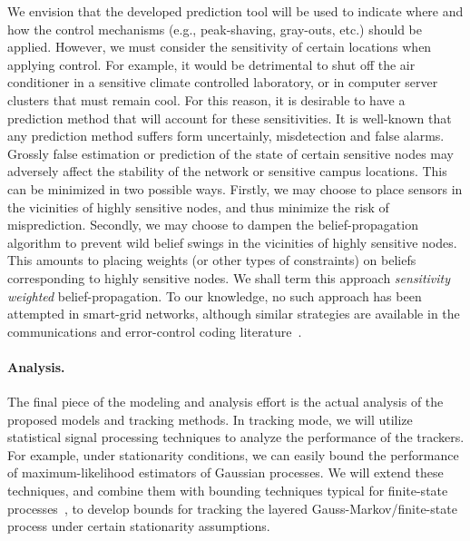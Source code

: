 We envision that the developed prediction tool will be used to
indicate where and how the control mechanisms (e.g., peak-shaving,
gray-outs, etc.) should be applied. However, we must consider the
sensitivity of certain locations when applying control.  For
example, it would be detrimental to shut off the air conditioner in
a sensitive climate controlled laboratory, or in computer server
clusters that must remain cool. For this reason, it is desirable to
have a prediction method that will account for these sensitivities.
It is well-known that any prediction method suffers form
uncertainly, misdetection and false alarms. Grossly false estimation
or prediction of the state of certain sensitive nodes may adversely
affect the stability of the network or sensitive campus locations.
This can be minimized in two possible ways. Firstly, we may choose
to place sensors in the vicinities of highly sensitive nodes, and
thus minimize the risk of misprediction. Secondly, we may choose to
dampen the belief-propagation algorithm to prevent wild belief
swings in the vicinities of highly sensitive nodes. This amounts to
placing weights (or other types of constraints) on beliefs
corresponding to highly sensitive nodes. We shall term this approach
{\em sensitivity weighted} belief-propagation. To our knowledge, no
such approach has been attempted in smart-grid networks, although
similar strategies are available in the communications and
error-control coding literature~\cite{Wang99,Jiang06a,Varnica07}.

\paragraph{Analysis.} The final piece of the modeling and analysis effort is the actual analysis of the proposed models and tracking methods. In tracking mode, we will utilize statistical signal processing techniques to analyze the performance of the trackers. For example, under stationarity conditions, we can easily bound the performance of maximum-likelihood estimators of Gaussian processes. We will extend these
techniques, and combine them with bounding techniques typical for
finite-state processes~\cite{Huang09}, to develop bounds for tracking the
layered Gauss-Markov/finite-state process  under certain stationarity assumptions.

